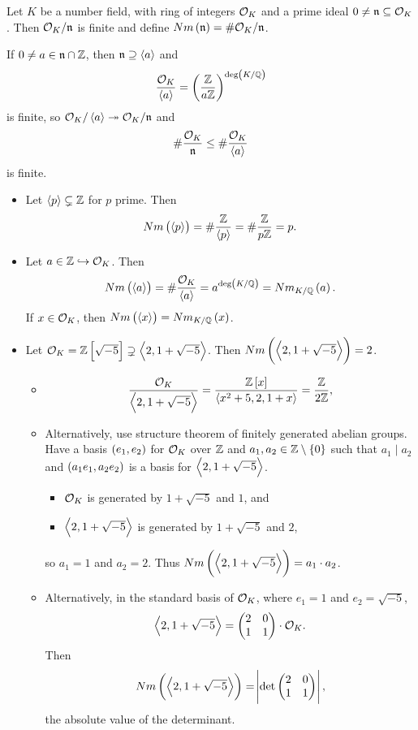 \begin{definition}
Let $ K $ be a number field, with ring of integers $ \mathcal{O}_K $ and a prime ideal $ 0 \ne \mathfrak{n} \subseteq \mathcal{O}_K $. Then $ \mathcal{O}_K / \mathfrak{n} $ is finite and define $ Nm\br{\nn} = \#\OO_K / \nn $.
\end{definition}

If $ 0 \ne a \in \mathfrak{n} \cap \mathbb{Z} $, then $ \mathfrak{n} \supseteq \left\langle a \right\rangle $ and
$$ \dfrac{\OO_K}{\abr{a}} = \br{\dfrac{\Z}{a\Z}}^{\deg\br{K / \Q}} $$
is finite, so $ \mathcal{O}_K / \left\langle a \right\rangle \twoheadrightarrow \mathcal{O}_K / \mathfrak{n} $ and
$$ \#\dfrac{\mathcal{O}_K}{\mathfrak{n}} \le \#\dfrac{\mathcal{O}_K}{\left\langle a \right\rangle} $$
is finite.

\pagebreak

\begin{example*}
\hfill
\begin{itemize}
\item Let $ \left\langle p \right\rangle \subsetneq \mathbb{Z} $ for $ p $ prime. Then
$$ Nm\br{\abr{p}} = \#\dfrac{\Z}{\abr{p}} = \#\dfrac{\Z}{p\Z} = p. $$
\item Let $ a \in \mathbb{Z} \hookrightarrow \mathcal{O}_K $. Then
$$ Nm\br{\abr{a}} = \#\dfrac{\OO_K}{\abr{a}} = a^{\deg\br{K / \Q}} = Nm_{K / \Q}\br{a}. $$
If $ x \in \mathcal{O}_K $, then $ Nm\br{\abr{x}} = Nm_{K / \Q}\br{x} $.
\item Let $ \OO_K = \Z\sbr{\sqrt{-5}} \supsetneq \abr{2, 1 + \sqrt{-5}} $. Then $ Nm\br{\abr{2, 1 + \sqrt{-5}}} = 2 $.
\begin{itemize}
\item
$$ \dfrac{\OO_K}{\abr{2, 1 + \sqrt{-5}}} = \dfrac{\Z\sbr{x}}{\abr{x^2 + 5, 2, 1 + x}} = \dfrac{\Z}{2\Z}, $$
\item Alternatively, use structure theorem of finitely generated abelian groups. Have a basis $ \br{e_1, e_2} $ for $ \mathcal{O}_K $ over $ \mathbb{Z} $ and $ a_1, a_2 \in \Z \setminus \cbr{0} $ such that $ a_1 \mid a_2 $ and $ \br{a_1e_1, a_2e_2} $ is a basis for $ \left\langle 2, 1 + \sqrt{-5} \right\rangle $.
\begin{itemize}
\item $ \mathcal{O}_K $ is generated by $ 1 + \sqrt{-5} $ and $ 1 $, and
\item $ \left\langle 2, 1 + \sqrt{-5} \right\rangle $ is generated by $ 1 + \sqrt{-5} $ and $ 2 $,
\end{itemize}
so $ a_1 = 1 $ and $ a_2 = 2 $. Thus $ Nm\br{\abr{2, 1 + \sqrt{-5}}} = a_1 \cdot a_2 $.
\item Alternatively, in the standard basis of $ \mathcal{O}_K $, where $ e_1 = 1 $ and $ e_2 = \sqrt{-5} $,
$$ \left\langle 2, 1 + \sqrt{-5} \right\rangle = \begin{pmatrix} 2 & 0 \\ 1 & 1 \end{pmatrix} \cdot \mathcal{O}_K. $$
Then
$$ Nm\br{\abr{2, 1 + \sqrt{-5}}} = \abs{\det\twobytwo{2}{0}{1}{1}}, $$
the absolute value of the determinant.
\end{itemize}
\end{itemize}
\end{example*}

